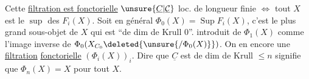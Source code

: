 Cette \uline{filtration est fonctorielle} $\unsure{\underline{C}|\underline{\mathcal{C}}}$ loc. de longueur finie $\Leftrightarrow$ tout $X$ est le $\sup$ des $F_i(X)$. Soit en général $\Phi_0(X)=\operatorname{Sup}F_i(X)$, c'est le plus grand sous-objet de $X$ qui est ``de dim de Krull 0''.
 introduit de  $\Phi_1(X)$ comme l'image inverse de $\Phi_0(X_{C_0}\deleted{\unsure{/\Phi_0(X)}})$. On en  encore une \uline{filtration} \uline{fonctorielle} $(\Phi_i(X))_i$. Dire que $\underline{C}$ est de dim de Krull $\leq n$ signifie que $\Phi_n(X)=X$ pour tout $X$.
